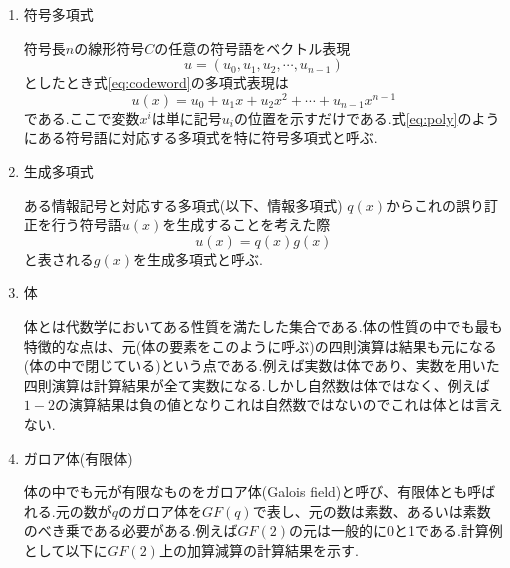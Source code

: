 \documentclass{thesis}
\begin{document}
\begin{enumerate}
\item 符号多項式

符号長$n$の線形符号$C$の任意の符号語をベクトル表現
\begin{equation}
u = (u_0,u_1,u_2,\cdots,u_{n-1})
\label{eq:codeword}
\end{equation}
としたとき式\ref{eq:codeword}の多項式表現は
\begin{equation}
u(x) = u_0+u_1x+u_2x^2+\cdots+u_{n-1}x^{n-1}
\label{eq:poly}
\end{equation}
である.ここで変数$x^i$は単に記号$u_i$の位置を示すだけである.式\ref{eq:poly}のようにある符号語に対応する多項式を特に符号多項式と呼ぶ.

\item 生成多項式

ある情報記号と対応する多項式(以下、情報多項式) $q(x)$からこれの誤り訂正を行う符号語$u(x)$を生成することを考えた際
\begin{equation}
u(x) = q(x)g(x)
\label{eq:gen_poly}
\end{equation}
と表される$g(x)$を生成多項式と呼ぶ.

\item 体

体とは代数学においてある性質を満たした集合である.体の性質の中でも最も特徴的な点は、元(体の要素をこのように呼ぶ)の四則演算は結果も元になる(体の中で閉じている)という点である.例えば実数は体であり、実数を用いた四則演算は計算結果が全て実数になる.しかし自然数は体ではなく、例えば$1-2$の演算結果は負の値となりこれは自然数ではないのでこれは体とは言えない.


\item ガロア体(有限体)

体の中でも元が有限なものをガロア体(Galois field)と呼び、有限体とも呼ばれる.元の数が$q$のガロア体を$GF(q)$で表し、元の数は素数、あるいは素数のべき乗である必要がある.例えば$GF(2)$の元は一般的に0と1である.計算例として以下に$GF(2)$上の加算減算の計算結果を示す.


\end{enumerate}
\end{document}
